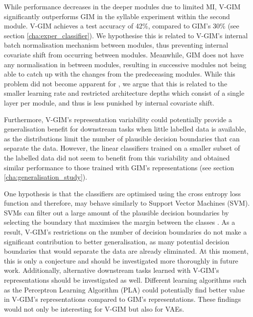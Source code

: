 	While performance decreases in the deeper modules due to limited MI, V-GIM significantly outperforms GIM in the syllable experiment within the second module. V-GIM achieves a test accuracy of 42\%, compared to GIM's 30\% (see section \ref{cha:exper_classifier}). We hypothesise this is related to V-GIM's internal batch normalisation mechanism between modules, thus preventing internal covariate shift from occurring between modules. Meanwhile, GIM does not have any normalisation in between modules, resulting in successive modules not being able to catch up with the changes from the predeceasing modules. While this problem did not become apparent for \citeauthor{lowePuttingEndEndtoEnd2020a}, we argue that this is related to the smaller learning rate and restricted architecture depths which consist of a single layer per module, and thus is less punished by internal covariate shift.
			
	Furthermore, V-GIM's representation variability could potentially provide a generalisation benefit for downstream tasks when little labelled data is available, as the distributions limit the number of plausible decision boundaries that can separate the data. However, the linear classifiers trained on a smaller subset of the labelled data did not seem to benefit from this variability and obtained similar performance to those trained with GIM's representations (see section \ref{cha:generalisation_study}). 
	
	One hypothesis is that the classifiers are optimised using the cross entropy loss function and therefore, may behave similarly to Support Vector Machines (SVM). SVMs can filter out a large amount of the plausible decision boundaries by selecting the boundary that maximises the margin between the classes \citep{hearstSupportVectorMachines1998, nobleWhatSupportVector2006}. As a result, V-GIM's restrictions on the number of decision boundaries do not make a significant contribution to better generalisation, as many potential decision boundaries that would separate the data are already eliminated. At this moment, this is only a conjecture and should be investigated more thoroughly in future work. Additionally, alternative downstream tasks learned with V-GIM's representations should be investigated as well. Different learning algorithms such as the Perceptron Learning Algorithm (PLA) could potentially find better value in V-GIM's representations compared to GIM's representations. These findings would not only be interesting for V-GIM but also for VAEs.
	
